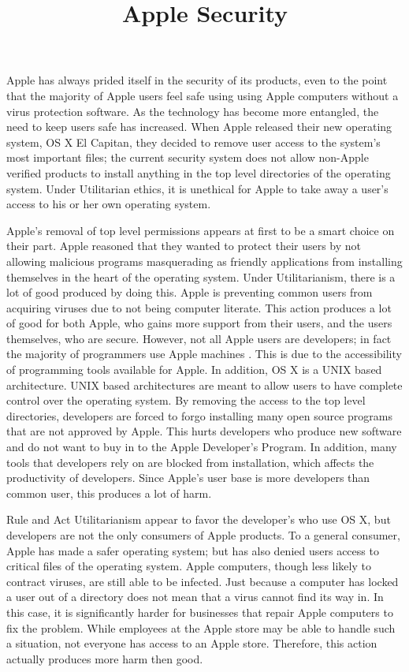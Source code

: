 \documentclass{paper}
\title{Apple Security}
\begin{document}
\finalh{}
\inlinetitle

\begin{linenumbers}

Apple has always prided itself in the security of its products, even to the point that the majority of Apple users feel safe using using Apple computers without a virus protection software. As the technology has become more entangled, the need to keep users safe has increased. When Apple released their new operating system, OS X El Capitan, they decided to remove user access to the system's most important files; the current security system does not allow non-Apple verified products to install anything in the top level directories of the operating system. Under Utilitarian ethics, it is unethical for Apple to take away a user's access to his or her own operating system.

Apple's removal of top level permissions appears at first to be a smart choice on their part. Apple reasoned that they wanted to protect their users by not allowing malicious programs masquerading as friendly applications from installing themselves in the heart of the operating system. Under Utilitarianism, there is a lot of good produced by doing this. Apple is preventing common users from acquiring viruses due to not being computer literate. This action produces a lot of good for both Apple, who gains more support from their users, and the users themselves, who are secure. However, not all Apple users are developers; in fact the majority of programmers use Apple machines \cite{wiki}. This is due to the accessibility of programming tools available for Apple. In addition, OS X is a UNIX based architecture. UNIX based architectures are meant to allow users to have complete control over the operating system. By removing the access to the top level directories, developers are forced to forgo installing many  open source programs that are not approved by Apple. This hurts developers who produce new software and do not want to buy in to the Apple Developer's Program. In addition, many tools that developers rely on are blocked from installation, which affects the productivity of developers. Since Apple's user base is more developers than common user, this produces a lot of harm.

Rule and Act Utilitarianism appear to favor the developer's who use OS X, but developers are not the only consumers of Apple products. To a general consumer, Apple has made a safer operating system; but has also denied users access to critical files of the operating system. Apple computers, though less likely to contract viruses, are still able to be infected. Just because a computer has locked a user out of a directory does not mean that a virus cannot find its way in. In this case, it is significantly harder for businesses that repair Apple computers to fix the problem. While employees at the Apple store may be able to handle such a situation, not everyone has access to an Apple store. Therefore, this action actually produces more harm then good.


\end{linenumbers}
\end{document}
